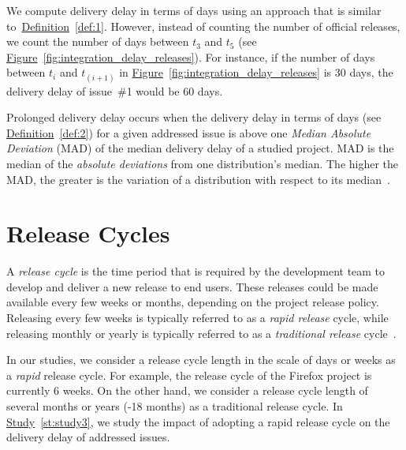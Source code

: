  We compute delivery delay in
terms of days using an approach that is similar
to~\hyperref[def:1]{Definition}~\ref{def:1}. However, instead of counting the
number of official releases, we count the number of days between {$t_3$} and
{$t_5$} (see
\hyperref[fig:integration_delay_releases]{Figure}~\ref{fig:integration_delay_releases}).
For instance, if the number of days between $t_i$ and $t_{(i+1)}$ in
\hyperref[fig:integration_delay_releases]{Figure}~\ref{fig:integration_delay_releases}
is 30 days, the delivery delay of issue~\#1 would be 60 days.

 Prolonged delivery delay occurs when the
delivery delay in terms of days (see \hyperref[def:2]{Definition}~\ref{def:2})
for a given addressed issue is above one {\em Median Absolute Deviation} (MAD)
of the median delivery delay of a studied project. MAD is the median of the
\textit{absolute deviations} from one distribution's median. The higher the MAD,
the greater is the variation of a distribution with respect to its
median~\cite{howell2005median,leys2013detecting}.

\section{Release Cycles} \label{subsec:firefox_releases}


A {\em release cycle} is the time period that is required by the development
team to develop and deliver a new release to end users. These releases could be
made available every few weeks or months, depending on the project release
policy. Releasing every few weeks is typically referred to as a \textit{rapid
release} cycle, while releasing monthly or yearly is typically referred to as a
\textit{traditional release} cycle~\cite{Mantyla2013}.

In our studies, we consider a release cycle length in the scale of days or weeks
as a {\em rapid} release cycle. For example, the release cycle of the Firefox
project is currently 6
weeks.
On the other hand, we consider a release cycle length of  several months or
years (-18 months) as a traditional release cycle. In
\hyperref[st:study3]{Study}~\ref{st:study3}, we study the impact of adopting a
rapid release cycle on the delivery delay of addressed issues.

